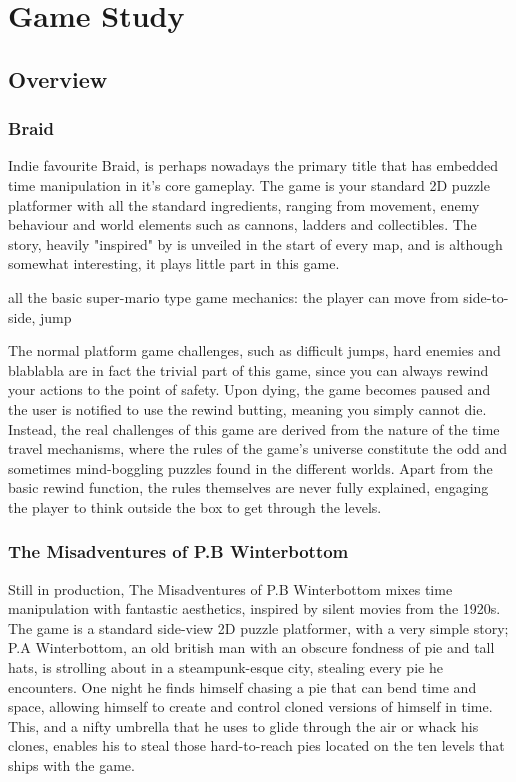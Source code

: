
\chapter{Game Study}

\section{Overview}

\subsection{Braid}
Indie favourite Braid, is perhaps nowadays the primary title that has embedded time manipulation in it's core gameplay. The game is your standard 2D puzzle platformer with all the standard ingredients, ranging from movement, enemy behaviour and world elements such as cannons, ladders and collectibles. The story, heavily "inspired" by is unveiled in the start of every map, and is although somewhat interesting, it plays little part in this game. 

all the basic super-mario type game mechanics: the player can move from side-to-side, jump 

The normal platform game challenges, such as difficult jumps, hard enemies and blablabla are in fact the trivial part of this game, since you can always rewind your actions to the point of safety. Upon dying, the game becomes paused and the user is notified to use the rewind butting, meaning you simply cannot die. Instead, the real challenges of this game are derived from the nature of the time travel mechanisms, where the rules of the game's universe constitute the odd and sometimes mind-boggling puzzles found in the different worlds. Apart from the basic rewind function, the rules themselves are never fully explained, engaging the player to think outside the box to get through the levels. 


\subsection{The Misadventures of P.B Winterbottom}

Still in production, The Misadventures of P.B Winterbottom mixes time manipulation with fantastic aesthetics, inspired by silent movies from the 1920s. 
The game is a standard side-view 2D puzzle platformer, with a very simple story; P.A Winterbottom, an old british man with an obscure fondness of pie and tall hats,
 is strolling about in a steampunk-esque city, stealing every pie he encounters. One night he finds himself chasing a pie that can bend time and space,
 allowing himself to create and control cloned versions of himself in time. This, and a nifty umbrella that he uses to glide through the air or whack his clones, 
enables his to steal those hard-to-reach pies located on the ten levels that ships with the game.

